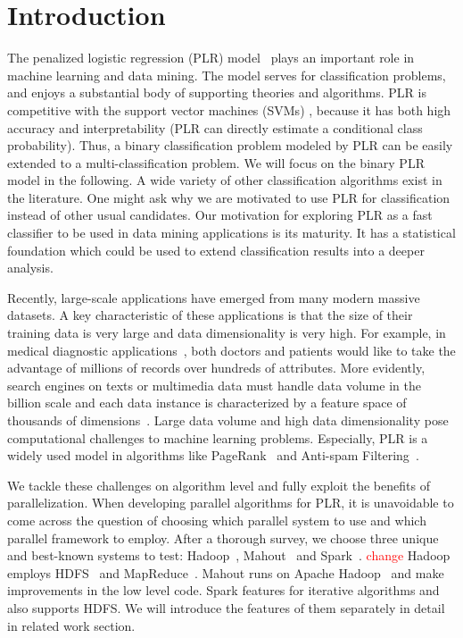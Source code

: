 \documentclass{llncs}
\newcommand{\comment}{\textcolor{red}}
\begin{document}
\section{Introduction} \label{sec:int}
The penalized logistic regression (PLR) model~\cite{HastieBook:SL} plays an important role in machine learning and data mining.
The model serves for classification problems, and enjoys a substantial body of supporting theories and algorithms.
PLR is competitive with the support vector machines (SVMs) \cite{Vapnik:1998}, because it has both high accuracy and interpretability (PLR can directly estimate a conditional class probability).
Thus, a binary classification problem modeled by PLR can be easily extended to a multi-classification problem.
We will focus on the binary PLR model in the following.
A wide variety of other classification algorithms exist in the literature. 
One might ask why we are motivated to use PLR for classification instead of other usual candidates.
Our motivation for exploring PLR as a fast classifier to be used in data mining applications is its maturity.
It has a statistical foundation which could be used to extend classification results into a deeper analysis.

Recently, large-scale applications have emerged from many modern massive datasets.
A key characteristic of these applications is that the size of their training data is very large and data dimensionality is very high.
For example, in medical diagnostic applications~\cite{tsumoto2004mining}, both doctors and patients would like to take the advantage of millions of records over hundreds of attributes. More evidently, search engines on texts or multimedia data must handle data volume in the billion scale and each data instance is characterized by a feature space of thousands of dimensions~\cite{genkin2007large}.
Large data volume and high data dimensionality pose computational challenges to machine learning problems.
Especially, PLR is a widely used model in algorithms like PageRank~\cite{page1999pagerank} and Anti-spam Filtering~\cite{androutsopoulos2000evaluation}.

We tackle these challenges on algorithm level and fully exploit the benefits of parallelization.
When developing parallel algorithms for PLR, it is unavoidable to come across the question of choosing which parallel system to use and which parallel framework to employ.
After a thorough survey, we choose three unique and best-known systems to test: Hadoop~\cite{white2012hadoop}, Mahout~\cite{mahoutscalable} and Spark~\cite{zaharia2010spark}. \comment{change}
Hadoop employs HDFS~\cite{borthakur2008hdfs} and MapReduce~\cite{dean2008mapreduce}. Mahout runs on Apache Hadoop~\cite{gropp1999using} and make improvements in the low level code. Spark features for iterative algorithms and also supports HDFS.
We will introduce the features of them separately in detail in related work section.
\end{document}
